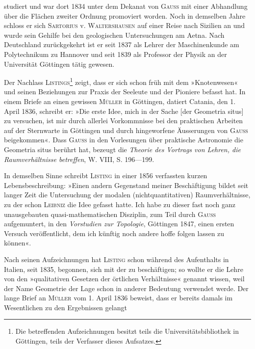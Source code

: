 studiert und war dort 1834 unter dem Dekanat von \textsc{Gauss} mit einer
Abhandlung über die Flächen zweiter Ordnung promoviert worden. Noch in
demselben Jahre schloss er sich \textsc{Sartorius} v. \textsc{Waltershausen} auf einer Reise
nach Sizilien an und wurde sein Gehilfe bei den geologischen Untersuchungen
am Aetna. Nach Deutschland zurückgekehrt ist er seit 1837 als Lehrer der
Maschinenkunde am Polytechnikum zu Hannover und seit 1839 als Professor
der Physik an der Universität Göttingen tätig gewesen.
\par
Der Nachlass \textsc{Listings}\footnote{Die betreffenden Aufzeichnungen besitzt teils die Universitätsbibliothek in Göttingen, teils der Verfasser dieses Aufsatzes.} zeigt, dass er sich schon früh mit dem »Knotenwesen«
und seinen Beziehungen zur Praxis der Seeleute und der Pioniere
\clearpage{}\setcounter{footnote}{0}
\noindent befasst hat. In einem Briefe an einen gewissen \textsc{Müller} in Göttingen, datiert
Catania, den 1. April 1836, schreibt er: »Die erste Idee, mich in der Sache
[der Geometria situs] zu versuchen, ist mir durch allerlei Vorkommnisse bei
den praktischen Arbeiten auf der Sternwarte in Göttingen und durch hingeworfene
Äusserungen von \textsc{Gauss} beigekommen«. Dass \textsc{Gauss} in den Vorlesungen
über praktische Astronomie die Geometria situs berührt hat, bezeugt
die \textit{Theorie des Vortrags von Lehren, die Raumverhältnisse betreffen}, W. VIII,
S. 196—199.
\par
In demselben Sinne schreibt \textsc{Listing} in einer 1856 verfassten kurzen
Lebensbeschreibung: »Einen andern Gegenstand meiner Beschäftigung bildet
seit langer Zeit die Untersuchung der modalen (nichtquantitativen) Raumverhältnisse,
zu der schon \textsc{Leibniz} die Idee gefasst hatte. Ich habe zu dieser
fast noch ganz unausgebauten quasi-mathematischen Disziplin, zum Teil durch
\textsc{Gauss} aufgemuntert, in den \textit{Vorstudien zur Topologie}, Göttingen 1847, einen
ersten Versuch veröffentlicht, dem ich künftig noch andere hoffe folgen lassen
zu können«.
\par
Nach seinen Aufzeichnungen hat \textsc{Listing} schon während des Aufenthalts
in Italien, seit 1835, begonnen, sich mit der  zu beschäftigen; so
wollte er die Lehre von den »qualitativen Gesetzen der örtlichen Verhältnisse«
genannt wissen, weil der Name Geometrie der Lage schon in anderer Bedeutung
verwendet werde. Der lange Brief an \textsc{Müller} vom 1. April 1836
beweist, dass er bereits damals im Wesentlichen zu den Ergebnissen gelangt
